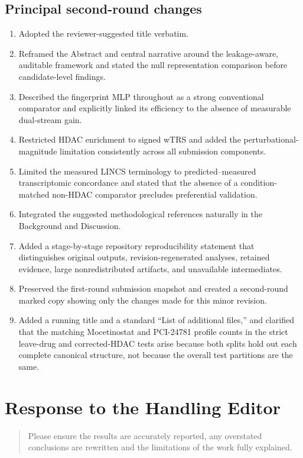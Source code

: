 \documentclass[10pt]{article}
\newenvironment{reviewcomment}{%
  \begin{quote}\small\itshape\color{black}
}{\end{quote}}
\begin{document}
\subsection*{Principal second-round changes}
\begin{enumerate}[leftmargin=1.7em,itemsep=0.25em]
\item Adopted the reviewer-suggested title verbatim.
\item Reframed the Abstract and central narrative around the leakage-aware, auditable framework and stated the null representation comparison before candidate-level findings.
\item Described the fingerprint MLP throughout as a strong conventional comparator and explicitly linked its efficiency to the absence of measurable dual-stream gain.
\item Restricted HDAC enrichment to signed wTRS and added the perturbational-magnitude limitation consistently across all submission components.
\item Limited the measured LINCS terminology to predicted--measured transcriptomic concordance and stated that the absence of a condition-matched non-HDAC comparator precludes preferential validation.
\item Integrated the suggested methodological references naturally in the Background and Discussion.
\item Added a stage-by-stage repository reproducibility statement that distinguishes original outputs, revision-regenerated analyses, retained evidence, large nonredistributed artifacts, and unavailable intermediates.
\item Preserved the first-round submission snapshot and created a second-round marked copy showing only the changes made for this minor revision.
\item Added a running title and a standard ``List of additional files,'' and clarified that the matching Mocetinostat and PCI-24781 profile counts in the strict leave-drug and corrected-HDAC tests arise because both splits hold out each complete canonical structure, not because the overall test partitions are the same.
\end{enumerate}

\section*{Response to the Handling Editor}

\begin{reviewcomment}
Please ensure the results are accurately reported, any overstated conclusions are rewritten and the limitations of the work fully explained.
\end{reviewcomment}
\end{document}
